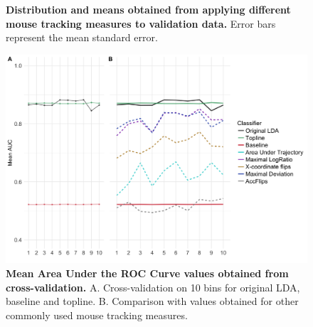\documentclass[11pt]{article}
\begin{document}
\begin{figure}
\caption{\textbf{Distribution and means obtained from applying different mouse tracking measures to validation data.} Error bars represent the mean standard error.}
\label{fig:different.measures.validation}

\end{figure}


\begin{figure}
\centering
\includegraphics[width=\textwidth]{auc_calibration_2.png}
\caption{\textbf{Mean Area Under the ROC Curve values obtained from cross-validation.} A. Cross-validation on 10 bins for original LDA, baseline and topline. B. Comparison with values obtained for other commonly used mouse tracking measures.} \label{DIST:AUC}
\label{DIST:AUC2}
\end{figure}
\end{document}
